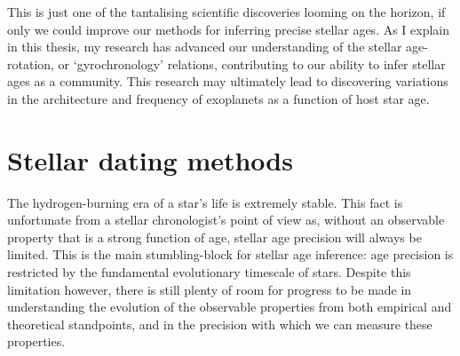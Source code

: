 This is just one of the tantalising scientific discoveries looming on the
horizon, if only we could improve our methods for inferring precise stellar
ages.
As I explain in this thesis, my research has advanced our understanding of the
stellar age-rotation, or `gyrochronology' relations, contributing to our
ability to infer stellar ages as a community.
This research may ultimately lead to discovering variations in the
architecture and frequency of exoplanets as a function of host star age.


\section{Stellar dating methods}

The hydrogen-burning era of a star's life is extremely stable.
This fact is unfortunate from a stellar chronologist's point of view as,
without an observable property that is a strong function of age, stellar age
precision will always be limited.
This is the main stumbling-block for stellar age inference: age precision is
restricted by the fundamental evolutionary timescale of stars.
Despite this limitation however, there is still plenty of room for progress to
be made in understanding the evolution of the observable properties from both
empirical and theoretical standpoints, and in the precision with which we can
measure these properties.

